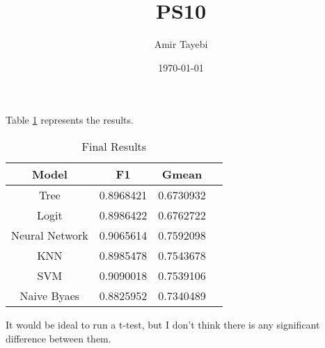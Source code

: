 \documentclass{article}
\title{PS10}
\author{Amir Tayebi }
\date{\today}
\begin{document}
\maketitle

\begin{center}
Table \ref{table:1} represents the results.
 
\begin{table}[h!]
\centering
\begin{tabular}{||c c c c||} 
 \hline
  Model &  F1 & Gmean & \\ [0.5ex] 
 \hline\hline
 Tree & 0.8968421 & 0.6730932 &\\ 
 Logit & 0.8986422 & 0.6762722 &\\
 Neural Network & 0.9065614 & 0.7592098 & \\
 KNN & 0.8985478 & 0.7543678 &\\
 SVM & 0.9090018 & 0.7539106 &\\
 Naive Byaes & 0.8825952 & 0.7340489 & \\ [1ex] 
 \hline
\end{tabular}
\caption{Final Results}
\label{table:1}
\end{table}
\end{center}

It would be ideal to run a t-test, but I don't think there is any significant difference between them.
\end{document}
